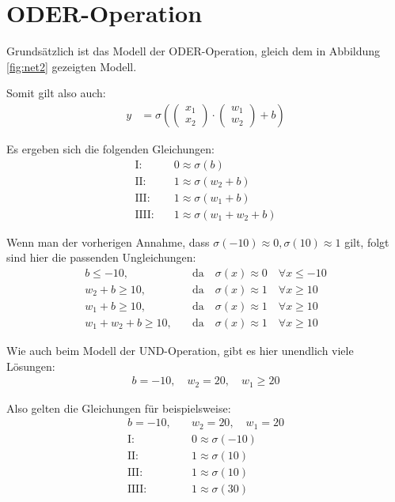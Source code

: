\section{ODER-Operation}
\begin{flushleft}
Grundsätzlich ist das Modell der ODER-Operation, gleich dem in Abbildung \ref{fig:net2} gezeigten Modell.

Somit gilt also auch:
\begin{align}
    y&=\sigma\left(\begin{pmatrix}
        x_1 \\
        x_2
    \end{pmatrix}\cdot
    \begin{pmatrix}
        w_1 \\
        w_2
    \end{pmatrix}+b\right)
\end{align}

Es ergeben sich die folgenden Gleichungen:
\begin{align}
    \text{I:}&\quad 0\approx\sigma(b) \\
    \text{II:}&\quad 1\approx\sigma(w_2+b) \\
    \text{III:}&\quad 1\approx\sigma(w_1+b) \\
    \text{IIII:}&\quad 1\approx\sigma(w_1+w_2+b)
\end{align}

Wenn man der vorherigen Annahme, dass $\sigma(-10)\approx 0,\sigma(10)\approx 1$ gilt, folgt sind hier die passenden Ungleichungen:
\begin{align}
    b\leq -10,&\quad\text{da}\quad\sigma(x)\approx 0\quad\forall x\leq -10 \\
    w_2+b\geq 10,&\quad\text{da}\quad\sigma(x)\approx 1\quad\forall x\geq 10 \\
    w_1+b\geq 10,&\quad\text{da}\quad\sigma(x)\approx 1\quad\forall x\geq 10 \\
    w_1+w_2+b\geq10,&\quad\text{da}\quad\sigma(x)\approx 1\quad\forall x\geq 10
\end{align}

Wie auch beim Modell der UND-Operation, gibt es hier unendlich viele Lösungen:
\begin{align}
    b=-10,\quad w_2=20,\quad w_1\geq 20
\end{align}

Also gelten die Gleichungen für beispielsweise:
\begin{align}
    b=-10,&\quad w_2=20,\quad w_1=20 \\
    \text{I:}&\quad 0\approx\sigma(-10) \\
    \text{II:}&\quad 1\approx\sigma(10) \\
    \text{III:}&\quad 1\approx\sigma(10) \\
    \text{IIII:}&\quad 1\approx\sigma(30)
\end{align}


\end{flushleft}
